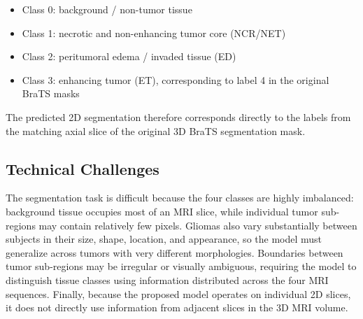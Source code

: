 \begin{itemize}
    \item Class 0: background / non-tumor tissue
    \item Class 1: necrotic and non-enhancing tumor core (NCR/NET)
    \item Class 2: peritumoral edema / invaded tissue (ED)
    \item Class 3: enhancing tumor (ET), corresponding to label 4 in the
          original BraTS masks
\end{itemize}

The predicted 2D segmentation therefore corresponds directly to the labels
from the matching axial slice of the original 3D BraTS segmentation mask.

\subsection{Technical Challenges}

The segmentation task is difficult because the four classes are highly
imbalanced: background tissue occupies most of an MRI slice, while individual
tumor sub-regions may contain relatively few pixels. Gliomas also vary
substantially between subjects in their size, shape, location, and appearance,
so the model must generalize across tumors with very different morphologies.
Boundaries between tumor sub-regions may be irregular or visually ambiguous,
requiring the model to distinguish tissue classes using information distributed
across the four MRI sequences. Finally, because the proposed model operates on
individual 2D slices, it does not directly use information from adjacent slices
in the 3D MRI volume.